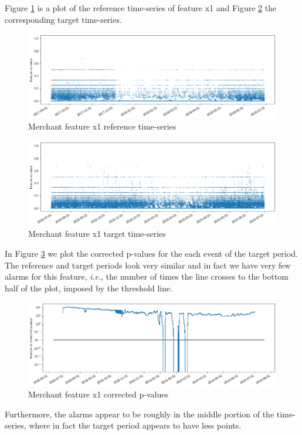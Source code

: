 Figure \ref{fig:merchant-x1-reference} is a plot of the reference time-series of feature x1 and Figure \ref{fig:merchant-x1-target} the corresponding target time-series.
\begin{figure}[!htb]
    \begin{center}
      \includegraphics[scale=0.5]{figures/merchant-x1-reference.png}
      \caption{Merchant feature x1 reference time-series}
      \label{fig:merchant-x1-reference}
    \end{center}
\end{figure}
\begin{figure}[!htb]
    \begin{center}
      \includegraphics[scale=0.5]{figures/merchant-x1-target.png}
      \caption{Merchant feature x1 target time-series}
      \label{fig:merchant-x1-target}
    \end{center}
\end{figure}
In Figure \ref{fig:merchant-x1-correctedpvalues} we plot the corrected p-values for the each event of the target period. The reference and target periods look very similar and in fact we have very few alarms for this feature, \textit{i.e.}, the number of times the line crosses to the bottom half of the plot, imposed by the threshold line. 
\begin{figure}[!htb]
    \begin{center}
      \includegraphics[scale=0.5]{figures/merchant-x1-correctedpvalues.png}
      \caption{Merchant feature x1 corrected p-values}
      \label{fig:merchant-x1-correctedpvalues}
    \end{center}
\end{figure}
Furthermore, the alarms appear to be roughly in the middle portion of the time-series, where in fact the target period appears to have less points.

